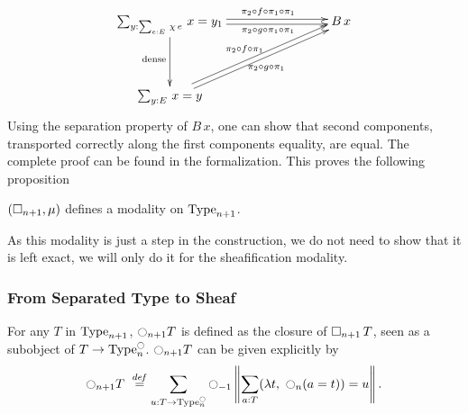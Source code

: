 \[\xymatrix@C=8em@R=4em{
  \sumD y {\sumD e E {\chi\,
  e}} {x=y_1} \ar@<2pt>[r]^{\qquad \pi_2\circ f\circ\pi_1\circ \pi_1}
\ar@<-2pt>[r]_{\qquad \pi_2\circ g\circ \pi_1\circ \pi_1}
\ar[d]_{\mathrm{dense}}& B\,x \\
  \sumD y E {x = y} \ar@<2pt>[ur]^{\pi_2\circ f\circ \pi_1} \ar@<-2pt>[ur]_{\pi_2\circ g\circ \pi_1}&
}\]%
Using the separation property of $B\,x$, one can show that second
components, transported correctly along the first components equality,
are equal. The complete proof can be found in the formalization.
This proves the following proposition
\begin{prop}
\label{prop:sep-mod}
  $(\mathop{\square_{n+1}},\mu)$ defines a modality on $\operatorname{Type}_{n+1}$.
\end{prop}

As this modality is just a step in the construction, we do not need to
show that it is left exact, we will only do it for the sheafification
modality.

\subsubsection{From Separated Type to Sheaf}
\label{sssec:separated-to-sheaf}

For any $T$ in $\operatorname{Type}_{n+1}$, 
$\ocircle_{n+1}T$ is defined as the closure of $\mathop{\square_{n+1}} T$,
seen as a subobject of $T \to \operatorname{Type}_n^{\ocircle}$. 
%
$\ocircle_{n+1}T$ can be given explicitly by
\[
\ocircle_{n+1} T \ \overset{de\hspace{-0.2ex}f}{=} \sum_{u:T \to \operatorname{Type}_n^{\ocircle}} \ocircle_{-1}\left\| \sum_{a:T} 
            (\lambda t,~\ocircle_n (a=t)) = u\right\|.
\]%

